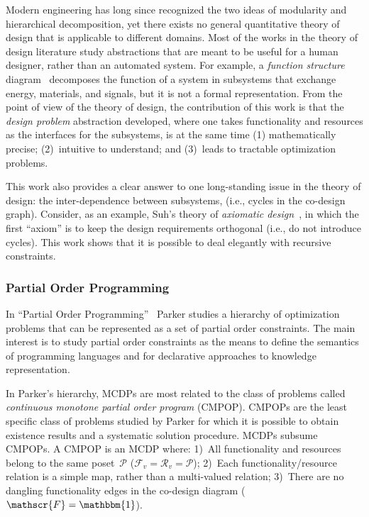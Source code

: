 \documentclass[twocolumn,english]{IEEEtran}
\theoremstyle{definition}
\theoremstyle{plain}
\theoremstyle{definition}
\theoremstyle{remark}
\theoremstyle{definition}
\theoremstyle{plain}
\theoremstyle{plain}
\newcommand{\posA}{\mathcal{P}}
\newcommand{\funsp}{\mathscr{F}}
\newcommand{\ressp}{\mathscr{R}}
\newcommand{\One}{\mathbbm{1}}
\begin{document}
Modern engineering has long since recognized the two ideas of modularity
and hierarchical decomposition, yet there exists no general quantitative
theory of design that is applicable to different domains. Most of
the works in the theory of design literature study abstractions that
are meant to be useful for a human designer, rather than an automated
system. For example, a \emph{function structure }diagram~\cite[p. 32]{pahl07}
decomposes the function of a system in subsystems that exchange energy,
materials, and signals, but it is not a formal representation. From
the point of view of the theory of design, the contribution of this
work is that the \emph{design problem }abstraction developed, where
one takes functionality and resources as the interfaces for the subsystems,
is at the same time (1) mathematically precise; (2)~intuitive to
understand; and (3)~leads to tractable optimization problems.

This work also provides a clear answer to one long-standing issue
in the theory of design: the inter-dependence between subsystems,
(i.e., cycles in the co-design graph). Consider, as an example, Suh's
theory of \emph{axiomatic design~}\cite{suh01}, in which the first
``axiom'' is to keep the design requirements orthogonal (i.e., do
not introduce cycles). This work shows that it is possible to deal
elegantly with recursive constraints.


\subsubsection*{Partial Order Programming}

In ``Partial Order Programming''~\cite{parkerjr89partial} Parker
studies a hierarchy of optimization problems that can be represented
as a set of partial order constraints. The main interest is to study
partial order constraints as the means to define the semantics of
programming languages and for declarative approaches to knowledge
representation.

In Parker's hierarchy, MCDPs are most related to the class of problems
called \emph{continuous monotone partial order program} (CMPOP). CMPOPs
are the least specific class of problems studied by Parker for which
it is possible to obtain existence results and a systematic solution
procedure. MCDPs subsume CMPOPs. A CMPOP is an MCDP where: 1)~All
functionality and resources belong to the same poset~$\posA$ ($\funsp_{v}=\ressp_{v}=\posA$);
2)~Each functionality/resource relation is a simple map, rather than
a multi-valued relation; 3)~There are no dangling functionality edges
in the co-design diagram ($\funsp=\One$).
\end{document}
